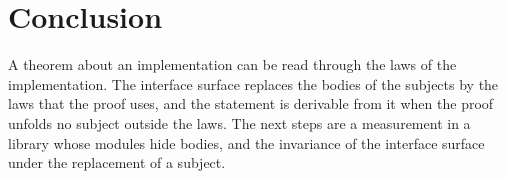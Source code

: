 \documentclass[acmsmall,nonacm,screen]{acmart}
\begin{document}
\section{Conclusion}

A theorem about an implementation can be read through the laws of the implementation. The
interface surface replaces the bodies of the subjects by the laws that the proof uses, and the
statement is derivable from it when the proof unfolds no subject outside the laws. The next steps
are a measurement in a library whose modules hide bodies, and the invariance of the interface
surface under the replacement of a subject.



\end{document}
